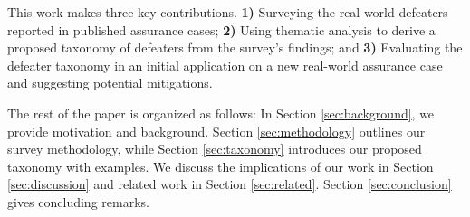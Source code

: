 This work makes three key contributions. \textbf{1)} Surveying the real-world defeaters reported in published assurance cases;  
\textbf{2) }Using thematic analysis to derive a proposed taxonomy of defeaters from the survey’s findings; and \textbf{3) }Evaluating the defeater taxonomy in an initial application on a new real-world assurance case and suggesting potential mitigations.

The rest of the paper is organized as follows: In Section \ref{sec:background}, we provide motivation and background. Section \ref{sec:methodology} outlines our survey methodology, while Section \ref{sec:taxonomy} introduces our proposed taxonomy with examples. We discuss the implications of our work in Section \ref{sec:discussion} and related work in Section \ref{sec:related}. Section \ref{sec:conclusion} gives concluding remarks. 


